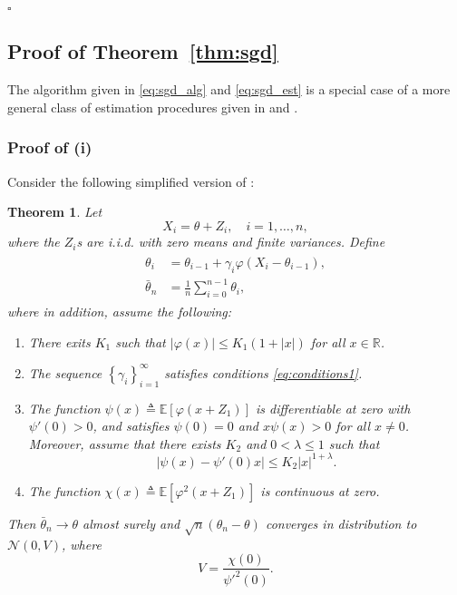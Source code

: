 \documentclass[letterpaper, 11pt]{IEEEtran}      %
\newtheorem{thm}{\bf{Theorem}}
\newcommand{\ex}[1]{\ensuremath{\mathbb{E}\left[ #1\right]}}
\newcommand*{\QEDA}{\hfill\ensuremath{\square}}
\newcommand{\Ncal}{\mathcal{N}}
\begin{document}
\QEDA

\subsection{Proof of Theorem~\ref{thm:sgd}
\label{proof:thm:sgd}
}
The algorithm given in \eqref{eq:sgd_alg} and \eqref{eq:sgd_est} is a special case of a more general class of estimation procedures given in \cite{polyak1992acceleration} and \cite{polyak1990new}. 

\subsubsection*{Proof of (i)}
Consider the following simplified version of \cite[Thm. 4]{polyak1992acceleration}:
\begin{thm}{\cite[Thm. 4]{polyak1992acceleration}} \label{thm:polyak_juditsky}
Let 
\[
X_i = \theta + Z_i,\quad i=1,\ldots,n,
\]
where the $Z_i$s are i.i.d. with zero means and finite variances. Define
\begin{align}
\begin{split}
\theta_i & = \theta_{i-1} + \gamma_i \varphi(X_i - \theta_{i-1}), \\
\bar{\theta}_n & = \frac{1}{n} \sum_{i=0}^{n-1} \theta_i, 
\end{split}
\label{eq:Polyak_Juditsky_alg}
\end{align}
where in addition, assume the following: 
\begin{enumerate}
\item[(i)] There exits $K_1$ such that $\left| \varphi(x) \right| \leq K_1(1+|x|)$ for all $x\in \mathbb R$.
\item[(ii)] The sequence $\left\{ \gamma_i \right\}_{i=1}^\infty$ satisfies conditions \eqref{eq:conditions1}.
\item[(iii)] The function $\psi(x) \triangleq \ex{ \varphi(x+Z_1)}$ is differentiable at zero with $\psi'(0)>0$, and satisfies $\psi(0)=0$ and $x\psi(x) >0$ for all $x\neq 0$.
Moreover, assume that there exists $K_2$ and $0<\lambda \leq 1$ such that
\begin{equation}
\label{eq:Polyak_Juditsky_cond3}
\left| \psi(x) - \psi'(0)x \right|\leq K_2 |x|^{1+\lambda}.
\end{equation}
\item[(iv)] The function 
$\chi(x) \triangleq \ex{\varphi^2(x+Z_1)}$ is continuous at zero. 
\end{enumerate}
Then $\bar{\theta}_n \rightarrow \theta$ almost surely and $ \sqrt{n}({\theta}_n - \theta)$ converges in distribution to $\Ncal(0,V)$, where
\[
V = \frac{ \chi(0)} {\psi'^2(0)}. 
\]
\end{thm}
\end{document}
